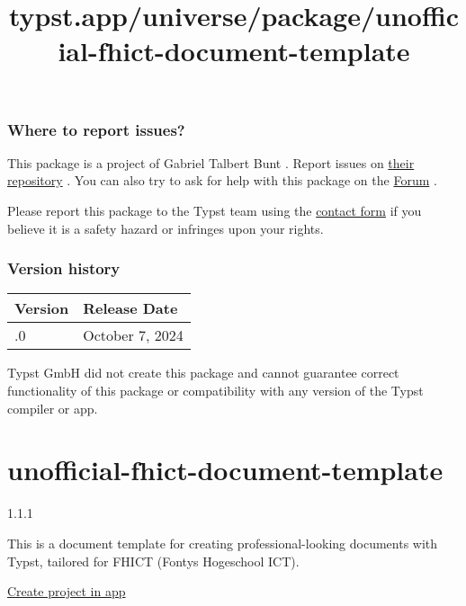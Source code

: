 \subsubsection{Where to report issues?}\label{where-to-report-issues}

This package is a project of Gabriel Talbert Bunt . Report issues on
\href{https://github.com/GabrielDTB/basalt-backlinks}{their repository}
. You can also try to ask for help with this package on the
\href{https://forum.typst.app}{Forum} .

Please report this package to the Typst team using the
\href{https://typst.app/contact}{contact form} if you believe it is a
safety hazard or infringes upon your rights.

\label{versions}
\subsubsection{Version history}\label{version-history}

\begin{longtable}[]{@{}ll@{}}
\toprule\noalign{}
Version & Release Date \\
\midrule\noalign{}
\endhead
\bottomrule\noalign{}
\endlastfoot
0.1.0 & October 7, 2024 \\
\end{longtable}

Typst GmbH did not create this package and cannot guarantee correct
functionality of this package or compatibility with any version of the
Typst compiler or app.


\title{typst.app/universe/package/unofficial-fhict-document-template}

\label{banner}
\label{template-thumbnail}

\section{unofficial-fhict-document-template}\label{unofficial-fhict-document-template}

{ 1.1.1 }

This is a document template for creating professional-looking documents
with Typst, tailored for FHICT (Fontys Hogeschool ICT).

\href{/app?template=unofficial-fhict-document-template&version=1.1.1}{Create
project in app}

